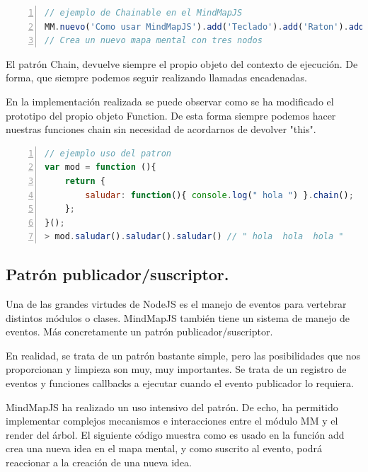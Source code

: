 \begin{lstlisting}[language=JavaScript, numbers=left]
// ejemplo de Chainable en el MindMapJS
MM.nuevo('Como usar MindMapJS').add('Teclado').add('Raton').add('Tablet');
// Crea un nuevo mapa mental con tres nodos 
\end{lstlisting}

El patrón Chain, devuelve siempre el propio objeto del contexto de ejecución. De forma, que siempre podemos seguir realizando llamadas encadenadas. 



En la implementación realizada se puede observar como se ha modificado el prototipo del propio objeto Function. De esta forma siempre podemos hacer nuestras funciones chain sin necesidad de acordarnos de devolver "this".

\begin{lstlisting}[language=JavaScript, numbers=left]
// ejemplo uso del patron
var mod = function (){
	return {
		saludar: function(){ console.log(" hola ") }.chain();
	};
}();
> mod.saludar().saludar().saludar() // " hola  hola  hola "
\end{lstlisting}


\subsection{Patrón publicador/suscriptor.}

Una de las grandes virtudes de NodeJS es el manejo de eventos para vertebrar distintos módulos o clases. MindMapJS también tiene un sistema de manejo de eventos. Más concretamente un patrón publicador/suscriptor. 



En realidad, se trata de un patrón bastante simple, pero las posibilidades que nos proporcionan y limpieza son muy, muy importantes. Se trata de un registro de eventos y funciones callbacks a ejecutar cuando el evento publicador lo requiera. 

MindMapJS ha realizado un uso intensivo del patrón. De echo, ha permitido implementar complejos mecanismos e interacciones entre el módulo MM y el render del árbol. El siguiente código muestra como es usado en la función add crea una nueva idea en el mapa mental, y como suscrito al evento, podrá reaccionar a la creación de una nueva idea.

